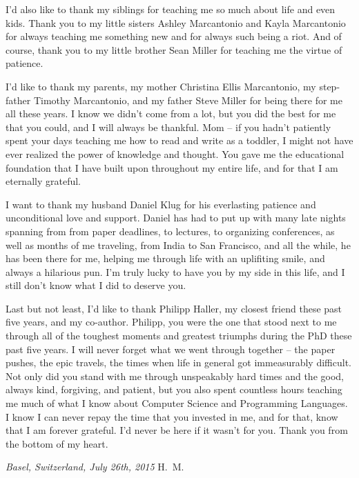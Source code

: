 \vspace{0.5cm}
I'd also like to thank my siblings for teaching me so much about life and even
kids. Thank you to my little sisters Ashley Marcantonio and Kayla Marcantonio
for always teaching me something new and for always such being a riot. And of
course, thank you to my little brother Sean Miller for teaching me the virtue of
patience.

\vspace{0.5cm}
I'd like to thank my parents, my mother Christina Ellis Marcantonio, my
step-father Timothy Marcantonio, and my father Steve Miller for being there for
me all these years. I know we didn't come from a lot, but you did the best for
me that you could, and I will always be thankful. Mom -- if you hadn't patiently
spent your days teaching me how to read and write as a toddler, I might not have
ever realized the power of knowledge and thought. You gave me the educational
foundation that I have built upon throughout my entire life, and for that I am
eternally grateful.

\vspace{0.5cm}
I want to thank my husband Daniel Klug for his everlasting patience and
unconditional love and support. Daniel has had to put up with many late nights
spanning from from paper deadlines, to lectures, to organizing conferences, as
well as months of me traveling, from India to San Francisco, and all the while,
he has been there for me, helping me through life with an uplifiting smile, and
always a hilarious pun. I'm truly lucky to have you by my side in this life, and
I still don't know what I did to deserve you.

\vspace{0.5cm}
Last but not least, I'd like to thank Philipp Haller, my closest friend these
past five years, and my co-author. Philipp, you were the one that stood next to
me through all of the toughest moments and greatest triumphs during the PhD
these past five years. I will never forget what we went through together -- the
paper pushes, the epic travels, the times when life in general got immeasurably
difficult. Not only did you stand with me through unspeakably hard times and the
good, always kind, forgiving, and patient, but you also spent countless hours
teaching me much of what I know about Computer Science and Programming
Languages. I know I can never repay the time that you invested in me, and for
that, know that I am forever grateful. I'd never be here if it wasn't for you.
Thank you from the bottom of my heart.

\bigskip

\noindent\textit{Basel, Switzerland, July 26th, 2015}
\hfill H.~M.
